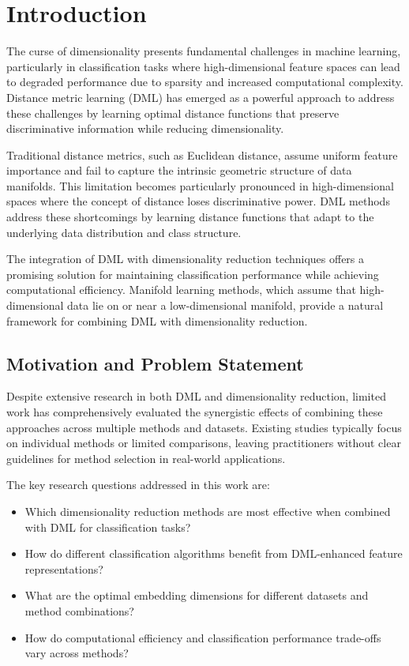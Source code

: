 \documentclass[review]{elsarticle}
\begin{document}
\linenumbers

\section{Introduction}
\label{sec:introduction}

The curse of dimensionality presents fundamental challenges in machine learning, particularly in classification tasks where high-dimensional feature spaces can lead to degraded performance due to sparsity and increased computational complexity. Distance metric learning (DML) has emerged as a powerful approach to address these challenges by learning optimal distance functions that preserve discriminative information while reducing dimensionality.

Traditional distance metrics, such as Euclidean distance, assume uniform feature importance and fail to capture the intrinsic geometric structure of data manifolds. This limitation becomes particularly pronounced in high-dimensional spaces where the concept of distance loses discriminative power. DML methods address these shortcomings by learning distance functions that adapt to the underlying data distribution and class structure.

The integration of DML with dimensionality reduction techniques offers a promising solution for maintaining classification performance while achieving computational efficiency. Manifold learning methods, which assume that high-dimensional data lie on or near a low-dimensional manifold, provide a natural framework for combining DML with dimensionality reduction.

\subsection{Motivation and Problem Statement}

Despite extensive research in both DML and dimensionality reduction, limited work has comprehensively evaluated the synergistic effects of combining these approaches across multiple methods and datasets. Existing studies typically focus on individual methods or limited comparisons, leaving practitioners without clear guidelines for method selection in real-world applications.

The key research questions addressed in this work are:
\begin{itemize}
\item Which dimensionality reduction methods are most effective when combined with DML for classification tasks?
\item How do different classification algorithms benefit from DML-enhanced feature representations?
\item What are the optimal embedding dimensions for different datasets and method combinations?
\item How do computational efficiency and classification performance trade-offs vary across methods?
\end{itemize}
\end{document}
